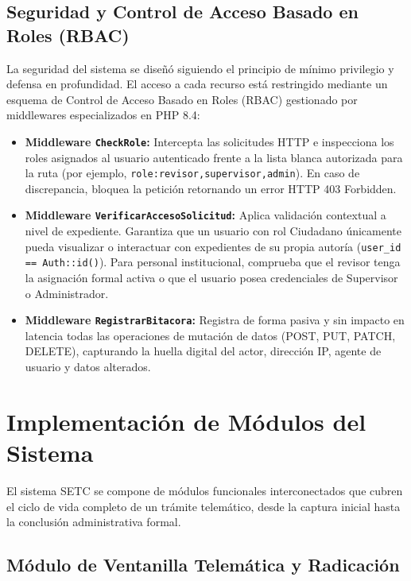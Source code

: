 \subsection{Seguridad y Control de Acceso Basado en Roles (RBAC)}

La seguridad del sistema se diseñó siguiendo el principio de mínimo privilegio y defensa en profundidad. El acceso a cada recurso está restringido mediante un esquema de Control de Acceso Basado en Roles (RBAC) gestionado por middlewares especializados en PHP 8.4:

\begin{itemize}
    \item \textbf{Middleware \texttt{CheckRole}:} Intercepta las solicitudes HTTP e inspecciona los roles asignados al usuario autenticado frente a la lista blanca autorizada para la ruta (por ejemplo, \texttt{role:revisor,supervisor,admin}). En caso de discrepancia, bloquea la petición retornando un error HTTP 403 Forbidden.
    \item \textbf{Middleware \texttt{VerificarAccesoSolicitud}:} Aplica validación contextual a nivel de expediente. Garantiza que un usuario con rol Ciudadano únicamente pueda visualizar o interactuar con expedientes de su propia autoría (\texttt{user\_id == Auth::id()}). Para personal institucional, comprueba que el revisor tenga la asignación formal activa o que el usuario posea credenciales de Supervisor o Administrador.
    \item \textbf{Middleware \texttt{RegistrarBitacora}:} Registra de forma pasiva y sin impacto en latencia todas las operaciones de mutación de datos (POST, PUT, PATCH, DELETE), capturando la huella digital del actor, dirección IP, agente de usuario y datos alterados.
\end{itemize}

\section{Implementación de Módulos del Sistema}

El sistema SETC se compone de módulos funcionales interconectados que cubren el ciclo de vida completo de un trámite telemático, desde la captura inicial hasta la conclusión administrativa formal.

\subsection{Módulo de Ventanilla Telemática y Radicación}

